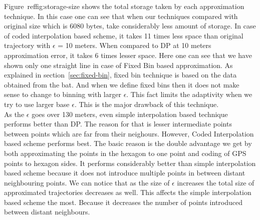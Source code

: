 \documentclass[conference]{IEEEtran}
\begin{document}
Figure~ref{fig:storage-size} shows the total storage taken by each approximation technique. In this case one can see 
that when our techniques compared with original size which is 6080 bytes, take considerably less amount of storage. 
In case of coded interpolation based scheme, it takes 11 times less space than original trajectory with $\epsilon$ = 10 
meters. When compared to DP at 10 meters approximation error, it takes 6 times lesser space. Here one can see that 
we have shown only one straight line in case of Fixed Bin based approximation. As explained in section~\ref{sec:fixed-bin}, 
fixed bin technique is based on the data obtained from the bat. And when we define fixed bins then it does not make sense 
to change to binning with larger $\epsilon$. This fact limits the adaptivity when we try to use larger base $\epsilon$. This is 
the major drawback of this technique.\\ 
As the $\epsilon$ goes over 130 meters, even simple interpolation based technique performs better than DP. The reason 
for that is lesser intermediate points between points which are far from their neighours. However, Coded Interpolation 
based scheme performs best. The basic reason is the double advantage we get by both approximating the points in the 
hexagon to one point and coding of GPS points to hexagon sides. It performs considerably better than simple interpolation 
based scheme because it does not introduce multiple points in between distant neighbouring points. We can notice that as 
the size of $\epsilon$ increases the total size of approximated trajectories decreases as well. This affects the simple 
interpolation based scheme the most. Because it decreases the number of points introduced between distant neighbours.\\
\end{document}
